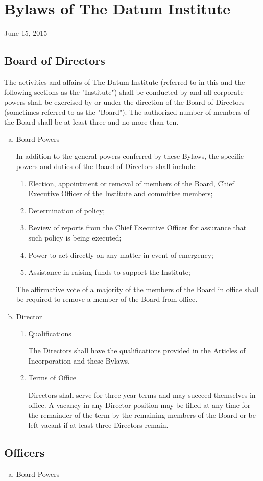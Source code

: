 \section{Bylaws of The Datum Institute}

June 15, 2015

\subsection{Board of Directors}

The activities and affairs of The Datum Institute (referred to in this and the following sections as the "Institute") shall be conducted by and all corporate powers shall be exercised by or under the direction of the Board of Directors (sometimes referred to as the "Board"). The authorized number of members of the Board shall be at least three and no more than ten. 

\begin{enumerate}[(a)]
\item Board Powers

In addition to the general powers conferred by these Bylaws, the specific powers and duties of the Board of Directors shall include:

\begin{enumerate}
\item Election, appointment or removal of members of the Board, Chief Executive Officer of the Institute and committee members; 
\item Determination of policy;
\item Review of reports from the Chief Executive Officer for assurance that such policy is being executed;
\item Power to act directly on any matter in event of emergency;
\item Assistance in raising funds to support the Institute;
\end{enumerate}

The affirmative vote of a majority of the members of the Board in office shall be required to remove a member of the Board from office.

\item Director

\begin{enumerate}
\item Qualifications

The Directors shall have the qualifications provided in the Articles of Incorporation and these Bylaws. 

\item Terms of Office

Directors shall serve for three-year terms and may succeed themselves in office.  A vacancy in any Director position may be filled at any time for the remainder of the term by the remaining members of the Board or be left vacant if at least three Directors remain.

\end{enumerate}

\end{enumerate}

\subsection{Officers}

\begin{enumerate}[(a)]
\item Board Powers
\end{enumerate}

